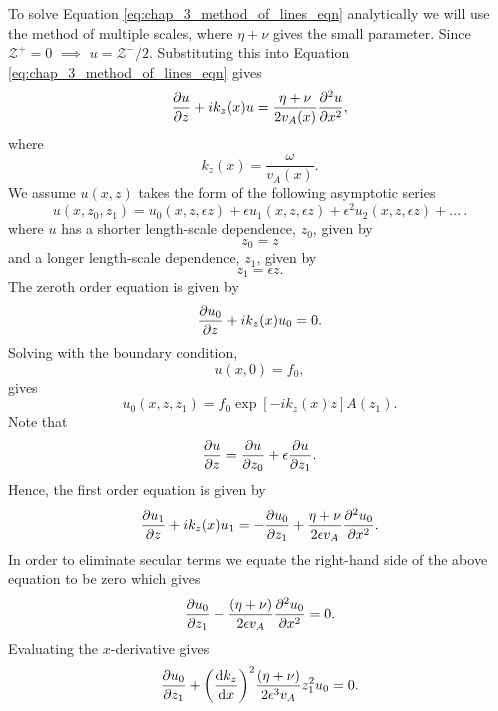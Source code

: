 To solve Equation \eqref{eq:chap_3_method_of_lines_eqn} analytically we will use the method of multiple scales, where $\eta+\nu$ gives the small parameter. Since $\mathcal{Z}^+=0$ $\implies$ $u = \mathcal{Z}^{-}/2$. Substituting this into Equation \eqref{eq:chap_3_method_of_lines_eqn} gives
\begin{equation}
    \pdv{u}{z}+ik_z(x)u=\frac{\eta+\nu}{2v_A(x)}\pdv[2]{u}{x},
\end{equation}
where
\begin{equation}
    k_z(x) = \frac{\omega}{v_A(x)}.
\end{equation}
We assume $u(x,z)$ takes the form of the following asymptotic series
\begin{equation}
    u(x,z_0,z_1) = u_0(x,z,\epsilon z) + \epsilon u_1(x,z,\epsilon z) + \epsilon^2 u_2(x,z,\epsilon z) + ...\,.
\end{equation}
where $u$ has a shorter length-scale dependence, $z_0$, given by
\begin{equation}
    z_0 = z
\end{equation}
and a longer length-scale dependence, $z_1$, given by
\begin{equation}
    z_1 = \epsilon z.
\end{equation}
The zeroth order equation is given by
\begin{equation}
    \pdv{u_0}{z}+ik_z(x)u_0=0.
\end{equation}
Solving with the boundary condition,
\begin{equation}
    u(x,0)=f_0,
\end{equation}
gives
\begin{equation}
    \label{eq:u_0_short_timescale}
    u_0(x,z,z_1) = f_0\exp[-ik_z(x)z]A(z_1).
\end{equation}
Note that
\begin{equation}
    \pdv{u}{z} = \pdv{u}{z_0} + \epsilon \pdv{u}{z_1}.
\end{equation}
Hence, the first order equation is given by
\begin{equation}
    \pdv{u_1}{z}+ik_z(x)u_1 = -\pdv{u_0}{z_1}+\frac{\eta+\nu}{2\epsilon v_A}\pdv[2]{u_0}{x}.
\end{equation}
In order to eliminate secular terms we equate the right-hand side of the above equation to be zero which gives
\begin{equation}
    \pdv{u_0}{z_1}-\frac{(\eta+\nu)}{2\epsilon v_A}\pdv[2]{u_0}{x}=0.
\end{equation}
Evaluating the $x$-derivative gives
\begin{equation}
    \pdv{u_0}{z_1}+\qty(\dv{k_z}{x})^2\frac{(\eta+\nu)}{2\epsilon^3 v_A}z_1^2u_0=0.
\end{equation}
